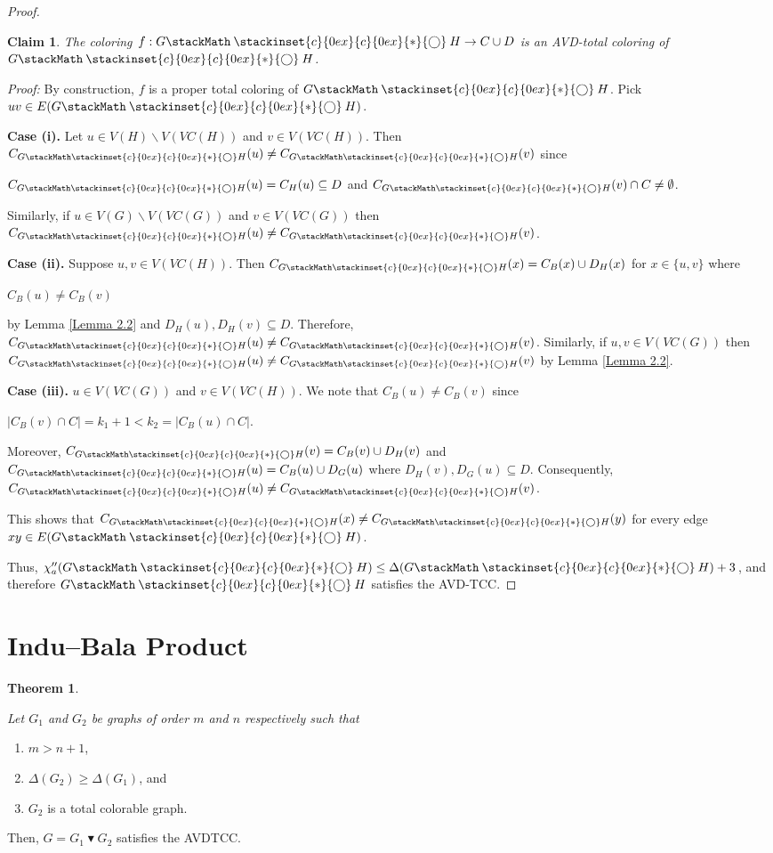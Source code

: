 \documentclass[12pt]{article}
\newcommand\oast{\stackMath\mathbin{\stackinset{c}{0ex}{c}{0ex}{\ast}{\bigcirc}}}
\theoremstyle{definition}
\newtheorem{thm}[defn]{Theorem}
\newtheorem{claim}{Claim}
\begin{document}
\begin{proof}
\begin{claim}\label{Claim 7}
{\em The coloring $f:G\oast H\rightarrow C\cup D$ is an AVD-total coloring of $G\oast H$.}
\end{claim}

\textit{Proof:}
By construction, 
$f$ is a proper total coloring of $G\oast H$.
Pick $uv\in E(G\oast H)$. 

\textbf{Case (i).} Let $u\in V(H)\backslash V(VC(H))$ and $v\in V(VC(H))$. 
Then $C_{G\oast H}(u)\neq C_{G\oast H}(v)$ since
\begin{center}
    $C_{G\oast H}(u)=C_{H}(u)\subseteq D$ and $C_{G\oast H}(v)\cap C\neq \emptyset$. 
\end{center}
Similarly, if $u\in V(G)\backslash V(VC(G))$ and $v\in V(VC(G))$ then $C_{G\oast H}(u)\neq C_{G\oast H}(v)$.


\textbf{Case (ii).} Suppose $u,v\in V(VC(H))$.
Then $C_{G\oast H}(x)=C_{B}(x)\cup D_{H}(x)$ for $x\in \{u,v\}$
where 
\begin{center}
$C_{B}(u)\neq C_{B}(v)$    
\end{center}
by Lemma \ref{Lemma 2.2} and $D_{H}(u), D_{H}(v)\subseteq D$. Therefore, $C_{G\oast H}(u)\neq C_{G\oast H}(v)$. 
Similarly, if $u,v\in V(VC(G))$ then 
$C_{G\oast H}(u)\neq C_{G\oast H}(v)$ by Lemma \ref{Lemma 2.2}.


\textbf{Case (iii).} $u\in V(VC(G))$ and $v\in V(VC(H))$. 
We note that $C_{B}(u)\neq C_{B}(v)$ since 
\begin{center}
    $|C_{B}(v)\cap C|=k_1+1<k_2=|C_{B}(u)\cap C|$. 
\end{center}
Moreover, 
$C_{G\oast H}(v)=C_{B}(v)\cup D_{H}(v)$ and
$C_{G\oast H}(u)=C_{B}(u)\cup D_{G}(u)$ where $D_H(v), D_{G}(u)\subseteq D$.
Consequently, $C_{G\oast H}(u)\neq C_{G\oast H}(v)$.   


This shows that $C_{G\oast H}(x)\neq C_{G\oast H}(y)$ for every edge $xy\in E(G\oast H)$. 

Thus, $\chi''_a(G\oast H) \le \Delta(G\oast H)+3$, and therefore $G\oast H$ satisfies the AVD-TCC.
\end{proof}

\section{Indu--Bala Product}

\begin{thm}\label{Theorem 8.1}
    {\em Let $G_1$ and $G_2$ be graphs of order $m$ and $n$ respectively such that
    \begin{enumerate}
        \item $m>n+1$,
        \item $\Delta(G_2)\geq\Delta(G_1)$, and
        \item $G_2$ is a total colorable graph.
    \end{enumerate}
    Then, $G=G_1\blacktriangledown G_2$ satisfies the AVDTCC.    
    }
\end{thm}
\end{document}
